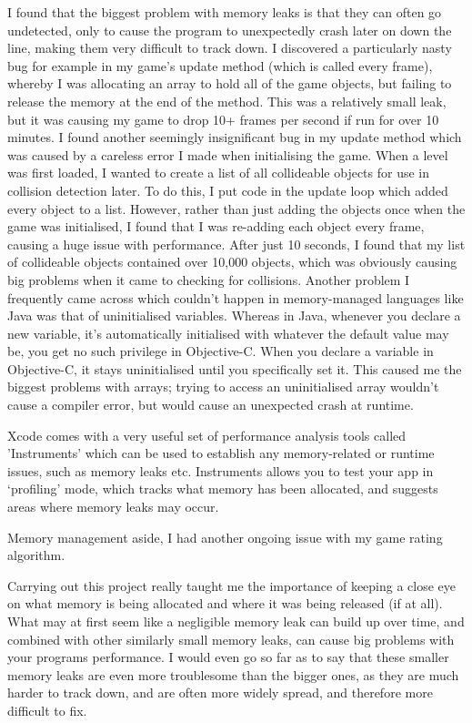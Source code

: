 \documentclass[a4paper,oneside]{report}
\begin{document}
I found that the biggest problem with memory leaks is that they can often go undetected, only to cause the program to unexpectedly crash later on down the line, making them very difficult to track down. I discovered a particularly nasty bug for example in my game's update method (which is called every frame), whereby I was allocating an array to hold all of the game objects, but failing to release the memory at the end of the method. This was a relatively small leak, but it was causing my game to drop 10+ frames per second if run for over 10 minutes. I found another seemingly insignificant bug in my update method which was caused by a careless error I made when initialising the game. When a level was first loaded, I wanted to create a list of all collideable objects for use in collision detection later. To do this, I put code in the update loop which added every object to a list. However, rather than just adding the objects once when the game was initialised, I found that I was re-adding each object every frame, causing a huge issue with performance. After just 10 seconds, I found that my list of collideable objects contained over 10,000 objects, which was obviously causing big problems when it came to checking for collisions. Another problem I frequently came across which couldn't happen in memory-managed languages like Java was that of uninitialised variables. Whereas in Java, whenever you declare a new variable, it's automatically initialised with whatever the default value may be, you get no such privilege in Objective-C. When you declare a variable in Objective-C, it stays uninitialised until you specifically set it. This caused me the biggest problems with arrays; trying to access an uninitialised array wouldn't cause a compiler error, but would cause an unexpected crash at runtime.

Xcode comes with a very useful set of performance analysis tools called 'Instruments' which can be used to establish any memory-related or runtime issues, such as memory leaks etc. Instruments allows you to test your app in `profiling' mode, which tracks what memory has been allocated, and suggests areas where memory leaks may occur.

Memory management aside, I had another ongoing issue with my game rating algorithm. 

Carrying out this project really taught me the importance of keeping a close eye on what memory is being allocated and where it was being released (if at all). What may at first seem like a negligible memory leak can build up over time, and combined with other similarly small memory leaks, can cause big problems with your programs performance. I would even go so far as to say that these smaller memory leaks are even more troublesome than the bigger ones, as they are much harder to track down, and are often more widely spread, and therefore more difficult to fix.
\end{document}
